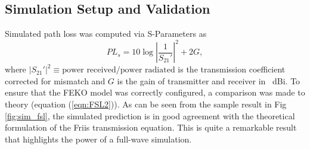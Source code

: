 \documentclass[10pt,journal,twoside]{IEEEtran}
\begin{document}
\subsection{Simulation Setup and Validation}
Simulated path loss was computed via S-Parameters as
\begin{equation}
PL_s = 10\log \left|\dfrac{1}{ S_{21}{'}}\right|^2 + 2G %
,
\end{equation}
where $\left|S_{21}{'}\right|^2 \equiv \text{power received}/\text{power radiated}$ is the transmission coefficient corrected for mismatch and $G$ is the gain of transmitter and receiver in \SI{}{dBi}. %
%
To ensure that the FEKO model was correctly configured, a comparison was made to theory (equation (\ref{eqn:FSL2})). As can be seen from the sample result in Fig \ref{fig:sim_fsl}, the simulated prediction is in good agreement with the theoretical formulation of the Friis transmission equation. This is quite a remarkable result that highlights the power of a full-wave simulation.
\end{document}
